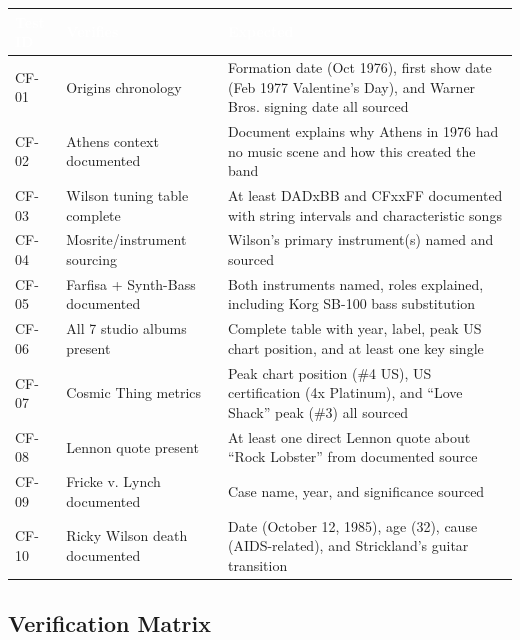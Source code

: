 \documentclass[11pt,letterpaper]{article}
\newcommand{\tableheader}[1]{\textbf{\sffamily\textcolor{white}{#1}}}
\begin{document}
\begin{center}
\begin{tabularx}{\textwidth}{C{1.5cm}L{4cm}X}
\toprule
{}
\tableheader{Test ID} & \tableheader{Verifies} & \tableheader{Expected} \\
\midrule
CF-01 & Origins chronology & Formation date (Oct 1976), first show date (Feb 1977 Valentine's Day), and Warner Bros. signing date all sourced \\
CF-02 & Athens context documented & Document explains why Athens in 1976 had no music scene and how this created the band \\
CF-03 & Wilson tuning table complete & At least DADxBB and CFxxFF documented with string intervals and characteristic songs \\
CF-04 & Mosrite/instrument sourcing & Wilson's primary instrument(s) named and sourced \\
CF-05 & Farfisa + Synth-Bass documented & Both instruments named, roles explained, including Korg SB-100 bass substitution \\
CF-06 & All 7 studio albums present & Complete table with year, label, peak US chart position, and at least one key single \\
CF-07 & Cosmic Thing metrics & Peak chart position (\#4 US), US certification (4x Platinum), and ``Love Shack'' peak (\#3) all sourced \\
CF-08 & Lennon quote present & At least one direct Lennon quote about ``Rock Lobster'' from documented source \\
CF-09 & Fricke v. Lynch documented & Case name, year, and significance sourced \\
CF-10 & Ricky Wilson death documented & Date (October 12, 1985), age (32), cause (AIDS-related), and Strickland's guitar transition \\
\bottomrule
\end{tabularx}
\end{center}

\subsection{Verification Matrix}
\end{document}
